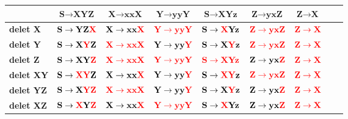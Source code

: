 \begin{table}[H]
	\centering
	\begin{tabular}{|m{2cm}||m{1.8cm}|m{1.8cm}|m{1.8cm}|m{1.8cm}|m{1.8cm}|m{1.8cm}|m{1.8cm}|m{1.8cm}|}
		\hline
		 & $ \textbf{S} \rightarrow \textbf{XYZ} $ & $ \textbf{X} \rightarrow \textbf{xxX} $ & $ \textbf{Y} \rightarrow \textbf{yyY} $ & $ \textbf{S} \rightarrow \textbf{XYz} $ & $ \textbf{Z} \rightarrow \textbf{yxZ} $ & $ \textbf{Z} \rightarrow \textbf{X} $ \\
		\hline \hline
		\textbf{delet X} & $ \textbf{S} \rightarrow \textbf{YZ\textcolor{red}{X}} $ & $ \textbf{X} \rightarrow \textbf{xx\textcolor{red}{X}} $ & $ \textcolor{red}{ \textbf{Y} \rightarrow \textbf{yyY} } $ & $ \textbf{S} \rightarrow \textbf{\textcolor{red}{X}Yz} $ & $ \textcolor{red}{ \textbf{Z} \rightarrow \textbf{yxZ} } $ & $ \textcolor{red}{ \textbf{Z} \rightarrow \textbf{X} } $ \\
		\hline
		\textbf{delet Y} & $ \textbf{S} \rightarrow \textbf{X\textcolor{red}{Y}Z} $ & $ \textcolor{red}{ \textbf{X} \rightarrow \textbf{xxX} } $ & $ \textbf{Y} \rightarrow \textbf{yy\textcolor{red}{Y}} $ & $ \textbf{S} \rightarrow \textbf{X\textcolor{red}{Y}z} $ & $ \textcolor{red}{ \textbf{Z} \rightarrow \textbf{yxZ} } $ & $ \textcolor{red}{ \textbf{Z} \rightarrow \textbf{X} } $ \\
		\hline
		\textbf{delet Z} & $ \textbf{S} \rightarrow \textbf{XY\textcolor{red}{Z}} $ & $ \textcolor{red}{ \textbf{X} \rightarrow \textbf{xxX} } $ & $ \textcolor{red}{ \textbf{Y} \rightarrow \textbf{yyY} } $ & $ \textcolor{red}{ \textbf{S} \rightarrow \textbf{XYz} } $ & $ \textbf{Z} \rightarrow \textbf{yx\textcolor{red}{Z}} $ & $ \textcolor{red}{ \textbf{Z} \rightarrow \textbf{X}} $ \\
		\hline
		\textbf{delet XY} & $ \textbf{S} \rightarrow \textbf{\textcolor{red}{XY}Z} $ & $ \textbf{X} \rightarrow \textbf{xx\textcolor{red}{X}} $ & $ \textbf{Y} \rightarrow \textbf{yy\textcolor{red}{Y}} $ & $ \textbf{S} \rightarrow \textbf{\textcolor{red}{XY}z} $ & $ \textcolor{red}{ \textbf{Z} \rightarrow \textbf{yxZ} } $ & $ \textcolor{red}{ \textbf{Z} \rightarrow \textbf{X} } $ \\
		\hline
		\textbf{delet YZ} & $ \textbf{S} \rightarrow \textbf{X\textcolor{red}{YZ}} $ & $ \textcolor{red}{ \textbf{X} \rightarrow \textbf{xxX}} $ & $ \textbf{Y} \rightarrow \textbf{yy\textcolor{red}{Y}} $ & $ \textbf{S} \rightarrow \textbf{X\textcolor{red}{Y}z} $ & $ \textbf{Z} \rightarrow \textbf{yx\textcolor{red}{Z}} $ & $ \textcolor{red}{ \textbf{Z} \rightarrow \textbf{X} } $ \\
		\hline
		\textbf{delet XZ} & $ \textbf{S} \rightarrow \textbf{\textcolor{red}{X}Y\textcolor{red}{Z}} $ & $ \textbf{X} \rightarrow \textbf{xx\textcolor{red}{X}} $ & $ \textcolor{red}{ \textbf{Y} \rightarrow \textbf{yyY} } $ & $ \textbf{S} \rightarrow \textbf{\textcolor{red}{X}Yz} $ & $ \textbf{Z} \rightarrow \textbf{yx\textcolor{red}{Z}} $ & $ \textcolor{red}{ \textbf{Z} \rightarrow \textbf{X} } $ \\
		\hline
	\end{tabular}
	\label{fig:tabla-prac-4A}
\end{table}

